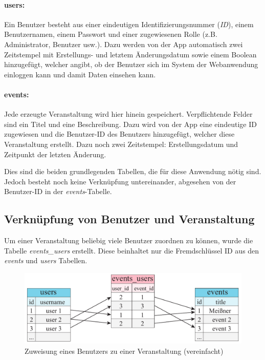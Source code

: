 \paragraph{users:}
Ein Benutzer besteht aus einer eindeutigen Identifizierungsnummer (\emph{ID}), einem Benutzernamen, einem Passwort und einer zugewiesenen Rolle (z.B. Administrator, Benutzer usw.). Dazu werden von der App automatisch zwei Zeitstempel mit Erstellungs- und letztem Änderungsdatum sowie einem Boolean hinzugefügt, welcher angibt, ob der Benutzer sich im System der Webanwendung einloggen kann und damit Daten einsehen kann.

\paragraph{events:}
Jede erzeugte Veranstaltung wird hier hinein gespeichert. Verpflichtende Felder sind ein Titel und eine Beschreibung. Dazu wird von der App eine eindeutige ID zugewiesen und die Benutzer-ID des Benutzers hinzugefügt, welcher diese Veranstaltung erstellt. Dazu noch zwei Zeitstempel: Erstellungsdatum und Zeitpunkt der letzten Änderung.\par

Dies sind die beiden grundlegenden Tabellen, die für diese Anwendung nötig sind. Jedoch besteht noch keine Verknüpfung untereinander, abgesehen von der Benutzer-ID in der \emph{events}-Tabelle.

\subsection{Verknüpfung von Benutzer und Veranstaltung}
Um einer Veranstaltung beliebig viele Benutzer zuordnen zu können, wurde die Tabelle \emph{events\_users} erstellt. Diese beinhaltet nur die Fremdschlüssel ID aus den \emph{events} und \emph{users} Tabellen.

\begin{figure}[!ht]
	\centering
	\includegraphics[width=15cm]{fig/events_users}
	\caption[Zuweisung eines Benutzers zu einer Veranstaltung]{Zuweisung eines Benutzers zu einer Veranstaltung (vereinfacht)}
\end{figure}

